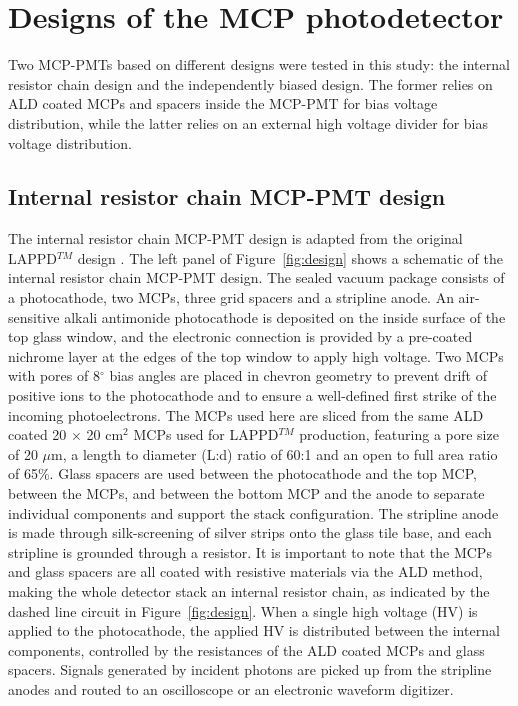 \documentclass[preprint,5p]{elsarticle}
\begin{document}
\section{Designs of the MCP photodetector} \label{sec_design}
Two MCP-PMTs based on different designs were tested in this study: the internal 
resistor chain design and the independently biased design. The former relies on 
ALD coated MCPs and spacers inside the MCP-PMT for bias voltage distribution, 
while the latter relies on an external high voltage divider for bias voltage 
distribution.  

\subsection{Internal resistor chain MCP-PMT design} \label{}
The internal resistor chain MCP-PMT design is adapted from the original 
LAPPD$^{TM}$ design \cite{17}. The left panel of Figure~\ref{fig:design} shows 
a schematic of the internal resistor chain MCP-PMT design. The sealed vacuum 
package consists of a photocathode, two MCPs, three grid spacers and a 
stripline anode.  An air-sensitive alkali antimonide photocathode is deposited 
on the inside surface of the top glass window, and the electronic connection is 
provided by a pre-coated nichrome layer at the edges of the top window to apply 
high voltage.  Two MCPs with pores of 8$^{\circ}$ bias angles are placed in chevron 
geometry to prevent drift of positive ions to the photocathode and to ensure a 
well-defined first strike of the incoming photoelectrons. The MCPs used here 
are sliced from the same ALD coated 20 $\times$ 20 cm$^2$ MCPs used
for LAPPD$^{TM}$ production, 
featuring a pore size of 20 $\mu$m, a length to diameter (L:d) ratio of 60:1 
and an open to full area ratio of 65\%.  Glass spacers are used between the 
photocathode and the top MCP, between the MCPs, and between the bottom MCP and 
the anode to separate individual components and support the stack 
configuration. The stripline anode is made through silk-screening of silver 
strips onto the glass tile base, and each stripline is grounded through a resistor.  
It is important to note that the MCPs and glass spacers are all coated with 
resistive materials via the ALD method, making the whole detector stack an internal 
resistor chain, as indicated by the dashed line circuit in 
Figure~\ref{fig:design}. When a single high voltage (HV) is applied to the 
photocathode, the applied HV is distributed between the internal components, 
controlled by the resistances of the ALD coated MCPs and glass spacers. Signals 
generated by incident photons are picked up from the stripline anodes and 
routed to an oscilloscope or an electronic waveform digitizer. 
\end{document}
